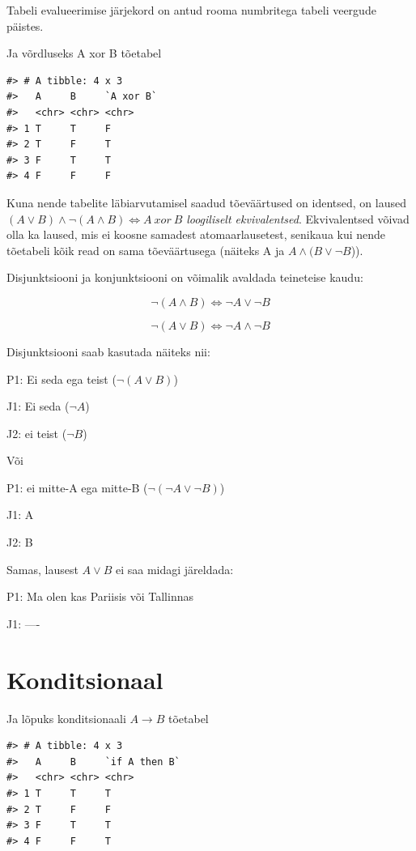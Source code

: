 \documentclass[]{book}
\begin{document}
Tabeli evalueerimise järjekord on antud rooma numbritega tabeli veergude
päistes.

Ja võrdluseks A xor B tõetabel

\begin{verbatim}
#> # A tibble: 4 x 3
#>   A     B     `A xor B`
#>   <chr> <chr> <chr>    
#> 1 T     T     F        
#> 2 T     F     T        
#> 3 F     T     T        
#> 4 F     F     F
\end{verbatim}

Kuna nende tabelite läbiarvutamisel saadud tõeväärtused on identsed, on
laused \((A \lor B) \land \neg (A \land B) \Leftrightarrow A ~ xor ~B\)
\emph{loogiliselt ekvivalentsed}. Ekvivalentsed võivad olla ka laused,
mis ei koosne samadest atomaarlausetest, senikaua kui nende tõetabeli
kõik read on sama tõeväärtusega (näiteks A ja \(A\land(B\lor\neg B\))).

Disjunktsiooni ja konjunktsiooni on võimalik avaldada teineteise kaudu:

\[\neg (A \land B) \Leftrightarrow \neg A \lor \neg B\]

\[\neg (A \lor B) \Leftrightarrow \neg A \land \neg B\]

Disjunktsiooni saab kasutada näiteks nii:

P1: Ei seda ega teist (\(\neg (A \lor B)\))

J1: Ei seda (\(\neg A\))

J2: ei teist (\(\neg B\))

Või

P1: ei mitte-A ega mitte-B (\(\neg (\neg A \lor \neg B)\))

J1: A

J2: B

Samas, lausest \(A \lor B\) ei saa midagi järeldada:

P1: Ma olen kas Pariisis või Tallinnas

J1: ----

\section{Konditsionaal}\label{konditsionaal}

Ja lõpuks konditsionaali \(A \rightarrow B\) tõetabel

\begin{verbatim}
#> # A tibble: 4 x 3
#>   A     B     `if A then B`
#>   <chr> <chr> <chr>        
#> 1 T     T     T            
#> 2 T     F     F            
#> 3 F     T     T            
#> 4 F     F     T
\end{verbatim}
\end{document}
